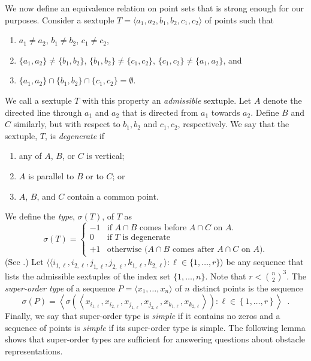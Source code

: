 \documentclass{patmorin}
\renewcommand{\note}[1]{}
\begin{document}
We now define an equivalence relation on point sets that is
strong enough for our purposes.  Consider a sextuple $T=\langle
a_1,a_2,b_1,b_2,c_1,c_2\rangle$ of points such that
\begin{enumerate}
  \item  $a_1\neq a_2$, $b_1\neq b_2$, $c_1\neq c_2$, 
  \item  $\{a_1,a_2\}\neq \{b_1,b_2\}$, 
$\{b_1,b_2\}\neq \{c_1,c_2\}$, $\{c_1,c_2\}\neq \{a_1,a_2\}$, and 
  \item $\{a_1,a_2\}\cap\{b_1,b_2\}\cap\{c_1,c_2\}=\emptyset$.
\end{enumerate}
We call a sextuple $T$ with this property an \emph{admissible} sextuple.
Let $A$ denote the directed line through $a_1$ and $a_2$ that is directed
from $a_1$ towards $a_2$. Define $B$ and $C$ similarly, but with respect
to $b_1,b_2$ and $c_1,c_2$, respectively.  We say that the sextuple,
$T$, is \emph{degenerate} if
\begin{enumerate}
  \item any of $A$, $B$, or $C$ is vertical;
  \item $A$ is parallel to $B$ or to $C$; or
  \item $A$, $B$, and $C$ contain a common point.
\end{enumerate}
\note{In your example, $A$, $B$, and $C$, share a common point, so they
are degenerate, so their type is 0.}
We define the \emph{type}, $\sigma(T)$, of $T$ as
\[
    \sigma(T) = \left\{\begin{array}{rl}
      -1 & \text{if $A\cap B$ comes before $A\cap C$ on $A$.} \\
      0 & \text{if $T$ is degenerate} \\
      +1 & \text{otherwise ($A\cap B$ comes after $A\cap C$ on $A$).} 
    \end{array}\right.
\]
(See .)  Let $\langle\langle
i_{1,\ell},i_{2,\ell},j_{1,\ell},j_{2,\ell},k_{1,\ell},k_{2,\ell}\rangle:
\ell \in \{1,\ldots,r\}\rangle$ be any sequence that lists the
admissible sextuples of the index set $\{1,\ldots,n\}$.  Note that $r<
\binom{n}{2}^3$.  The \emph{super-order type} of a sequence $P=\langle
x_1,\ldots,x_n\rangle$ of $n$ distinct points is the sequence
\[
   \sigma(P) = \left\langle \sigma\left(\left\langle x_{i_{1,\ell}},x_{i_{2,\ell}},
       x_{j_{1,\ell}},x_{j_{2,\ell}},
       x_{k_{1,\ell}},x_{k_{2,\ell}}\right\rangle\right) : \ell\in\left\{1,\ldots,r\right\} \right\rangle \enspace .
\]
Finally, we say that super-order type is \emph{simple} if it contains
no zeros and a sequence of points is \emph{simple} if its super-order
type is simple.  The following lemma shows that super-order types are
sufficient for answering questions about obstacle representations.
\end{document}
